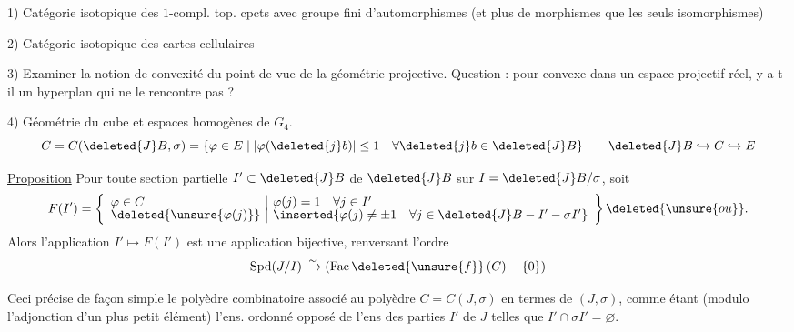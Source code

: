 1) Catégorie isotopique des \(1\)-compl. top. cpcts avec groupe fini d'automorphismes (et plus de morphismes que les seuls isomorphismes)

2) Catégorie isotopique des cartes cellulaires

3) Examiner la notion de convexité du point de vue de la géométrie projective. Question : pour  convexe dans un espace projectif réel, y-a-t-il un hyperplan qui ne le rencontre pas ?

4) Géométrie du cube et espaces homogènes de \(G_4\).
\[C=C(\deleted{J}B,\sigma)=\{\varphi\in E\mid\lvert\varphi(\deleted{j}b)\rvert\leq1\quad\forall \deleted{j}b\in\deleted{J}B\}\qquad\deleted{J}B\hookrightarrow C\hookrightarrow E\]

\uline{Proposition} Pour toute section partielle \(I'\subset \deleted{J}B\) de \(\deleted{J}B\) sur \(I=\deleted{J}B/\sigma\), soit
\[F(I')=\left\{\begin{array}{l|l}\varphi\in C&\varphi(j)=1\quad\forall j\in I'\\[-2pt]\deleted{\unsure{\varphi(j)}}&\inserted{\varphi(j)\neq\pm1\quad\forall j\in \deleted{J}B-I'-\sigma I'}\end{array}\right\}\deleted{\unsure{ou}}.\]
Alors l'application \(I'\longmapsto F(I')\) est une application bijective, renversant l'ordre
\[\operatorname{Spd}(J/I)\xrightarrow{\sim}(\operatorname{Fac}\deleted{\unsure{f}}\,(C)-\{0\})\]

Ceci précise de façon simple le  polyèdre combinatoire associé au polyèdre \(C=C(J,\sigma)\) en termes de \((J,\sigma)\), comme étant (modulo l'adjonction d'un plus petit élément) l'ens. ordonné opposé de l'ens des parties \(I'\) de \(J\) telles que \(I'\cap\sigma I'=\varnothing\).


